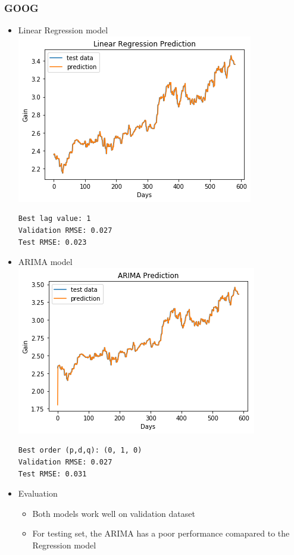 \documentclass[11pt]{article}
\makeatletter
\def\maxwidth{\ifdim\Gin@nat@width>\linewidth\linewidth
    \else\Gin@nat@width\fi}
\let\Oldincludegraphics\includegraphics
\renewcommand{\includegraphics}[1]{\Oldincludegraphics[width=.8\maxwidth]{#1}}
\providecommand{\tightlist}{%
      \setlength{\itemsep}{0pt}\setlength{\parskip}{0pt}}
\makeatother
\begin{document}
\subsubsection{GOOG}\label{goog}

\begin{itemize}
\item
  Linear Regression model \\
  \includegraphics{./figures/23.jpg}

\begin{verbatim}
Best lag value: 1
Validation RMSE: 0.027
Test RMSE: 0.023
\end{verbatim}
\item
  ARIMA model \\
  \includegraphics{./figures/24.jpg}

\begin{verbatim}
Best order (p,d,q): (0, 1, 0)
Validation RMSE: 0.027
Test RMSE: 0.031
\end{verbatim}
\item
  Evaluation

  \begin{itemize}
  \tightlist
  \item
    Both models work well on validation dataset
  \item
    For testing set, the ARIMA has a poor performance comapared to the
    Regression model
  \end{itemize}
\end{itemize}
\end{document}
